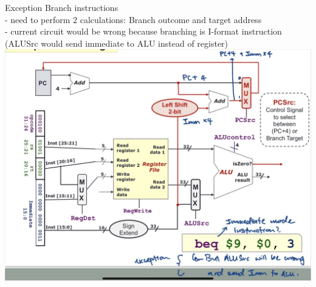 \documentclass[10pt, a4paper]{article}
\begin{document}
\begin{multicols*}{3}
		Exception Branch instructions\\
		- need to perform 2 calculations: Branch outcome and target address\\
		- current circuit would be wrong because branching is I-format instruction (ALUSrc would send immediate to ALU instead of register)\\
		\includegraphics[scale=.15]{./assets/ALU}\\
		

\end{multicols*}
\end{document}
